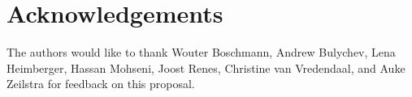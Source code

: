 \section{Acknowledgements}
The authors would like to thank Wouter Boschmann, Andrew Bulychev, Lena Heimberger, Hassan Mohseni, Joost Renes, Christine van Vredendaal, and Auke Zeilstra for feedback on this proposal.
